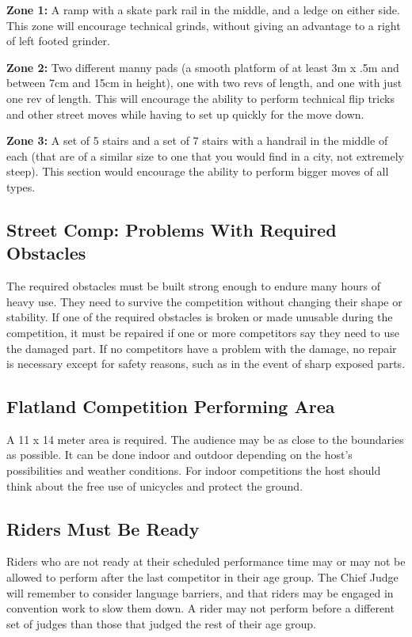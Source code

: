\textbf{Zone 1:}
A ramp with a skate park rail in the middle, and a ledge on either side.
This zone will encourage technical grinds, without giving an advantage to a right of left footed grinder.

\textbf{Zone 2:}
Two different manny pads (a smooth platform of at least 3m x .5m and between 7cm and 15cm in height), one with two revs of length, and one with just one rev of length.
This will encourage the ability to perform technical flip tricks and other street moves while having to set up quickly for the move down.

\textbf{Zone 3:}
A set of 5 stairs and a set of 7 stairs with a handrail in the middle of each (that are of a similar size to one that you would find in a city, not extremely steep).
This section would encourage the ability to perform bigger moves of all types.

\subsection{Street Comp: Problems With Required Obstacles}
The required obstacles must be built strong enough to endure many hours of heavy use.
They need to survive the competition without changing their shape or stability.
If one of the required obstacles is broken or made unusable during the competition, it must be repaired if one or more competitors say they need to use the damaged part.
If no competitors have a problem with the damage, no repair is necessary except for safety reasons, such as in the event of sharp exposed parts. 

\subsection{Flatland Competition Performing Area}
A 11 x 14 meter area is required.
The audience may be as close to the boundaries as possible.
It can be done indoor and outdoor depending on the host's possibilities and weather conditions.
For indoor competitions the host should think about the free use of unicycles and protect the ground. 

\subsection{Riders Must Be Ready}
Riders who are not ready at their scheduled performance time may or may not be allowed to perform after the last competitor in their age group.
The Chief Judge will remember to consider language barriers, and that riders may be engaged in convention work to slow them down.
A rider may not perform before a different set of judges than those that judged the rest of their age group.

